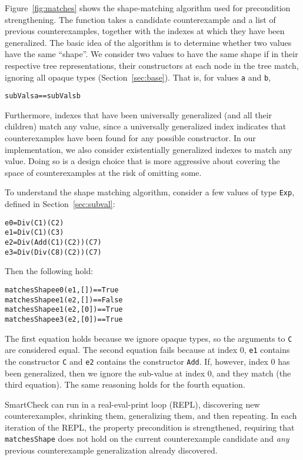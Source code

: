 \documentclass{sigplanconf}
\newenvironment{code}{\begin{alltt}\footnotesize}{\end{alltt}}
\newcommand{\ttp}[1]{\texttt{#1}}
\begin{document}
Figure~\ref{fig:matches} shows the shape-matching algorithm used for precondition
strengthening.  The function takes a candidate counterexample and a list of
previous counterexamples, together with the indexes at which they have been
generalized.  The basic idea of the algorithm is to determine whether two values
have the same ``shape''.  We consider two values to have the same
shape if in their respective tree representations, their constructors at each
node in the tree match, ignoring all opaque types (Section~\ref{sec:base}).
That is, for values \ttp{a} and \ttp{b},
%
\begin{code}
subVals a == subVals b
\end{code}
%
\noindent
Furthermore, indexes that have been universally generalized (and all their
children) match any value, since a universally generalized index indicates that
counterexamples have been found for any possible constructor.  In our
implementation, we also consider existentially generalized indexes to match any
value.  Doing so is a design choice that is more aggressive about covering the
space of counterexamples at the risk of omitting some.

To understand the shape matching algorithm, consider a few values of type
\ttp{Exp}, defined in Section~\ref{sec:subval}:
%
\begin{code}
e0 = Div (C 1) (C 2)
e1 = Div (C 1) (C 3)
e2 = Div (Add (C 1) (C 2)) (C 7)
e3 = Div (Div (C 8) (C 2)) (C 7)
\end{code}
%
\noindent
Then the following hold:
%
\begin{code}
matchesShape e0 (e1, [])  == True
matchesShape e1 (e2, [])  == False
matchesShape e1 (e2, [0]) == True
matchesShape e3 (e2, [0]) == True
\end{code}
%
The first equation holds because we ignore opaque types, so the arguments to
\ttp{C} are considered equal.  The second equation fails because at index 0,
\ttp{e1} contains the constructor \ttp{C} and \ttp{e2} contains the constructor
\ttp{Add}.  If, however, index 0 has been generalized, then we ignore the sub-value
at index 0, and they match (the third equation).  The same reasoning holds for
the fourth equation.

SmartCheck can run in a real-eval-print loop (REPL), discovering new
counterexamples, shrinking them, generalizing them, and then repeating.  In each
iteration of the REPL, the property precondition is strengthened, requiring that
\ttp{matchesShape} does not hold on the current counterexample candidate and
\emph{any} previous counterexample generalization already discovered.
\end{document}
